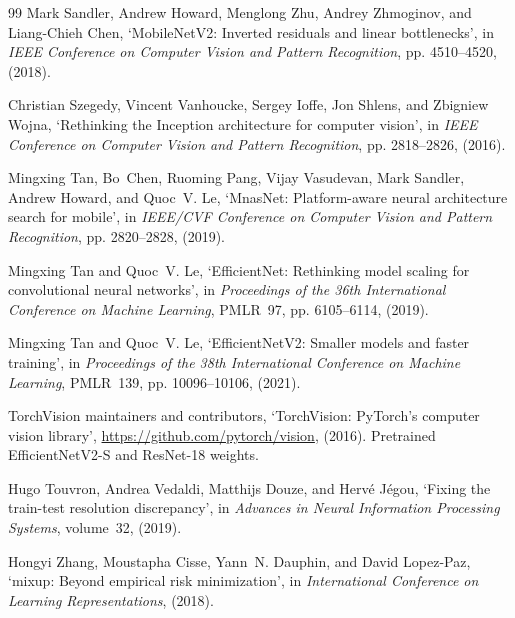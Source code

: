 \documentclass[10pt,twocolumn]{article}
\begin{document}
{\begin{thebibliography}{99}
Mark Sandler, Andrew Howard, Menglong Zhu, Andrey Zhmoginov, and Liang-Chieh Chen, `MobileNetV2:
Inverted residuals and linear bottlenecks', in \emph{IEEE Conference on Computer Vision and Pattern
Recognition}, pp. 4510--4520, (2018).

Christian Szegedy, Vincent Vanhoucke, Sergey Ioffe, Jon Shlens, and Zbigniew Wojna, `Rethinking the
Inception architecture for computer vision', in \emph{IEEE Conference on Computer Vision and Pattern
Recognition}, pp. 2818--2826, (2016).

Mingxing Tan, Bo~Chen, Ruoming Pang, Vijay Vasudevan, Mark Sandler, Andrew Howard, and Quoc~V. Le,
`MnasNet: Platform-aware neural architecture search for mobile', in \emph{IEEE/CVF Conference on
Computer Vision and Pattern Recognition}, pp. 2820--2828, (2019).

Mingxing Tan and Quoc~V. Le, `EfficientNet: Rethinking model scaling for convolutional neural
networks', in \emph{Proceedings of the 36th International Conference on Machine Learning}, PMLR~97,
pp. 6105--6114, (2019).

Mingxing Tan and Quoc~V. Le, `EfficientNetV2: Smaller models and faster training', in
\emph{Proceedings of the 38th International Conference on Machine Learning}, PMLR~139,
pp. 10096--10106, (2021).

TorchVision maintainers and contributors, `TorchVision: PyTorch's computer vision library',
\url{https://github.com/pytorch/vision}, (2016). Pretrained EfficientNetV2-S and ResNet-18 weights.

Hugo Touvron, Andrea Vedaldi, Matthijs Douze, and Herv{\'e} J{\'e}gou, `Fixing the train-test
resolution discrepancy', in \emph{Advances in Neural Information Processing Systems}, volume~32, (2019).

Hongyi Zhang, Moustapha Cisse, Yann~N. Dauphin, and David Lopez-Paz, `mixup: Beyond empirical risk
minimization', in \emph{International Conference on Learning Representations}, (2018).

\end{thebibliography}
}
\end{document}
